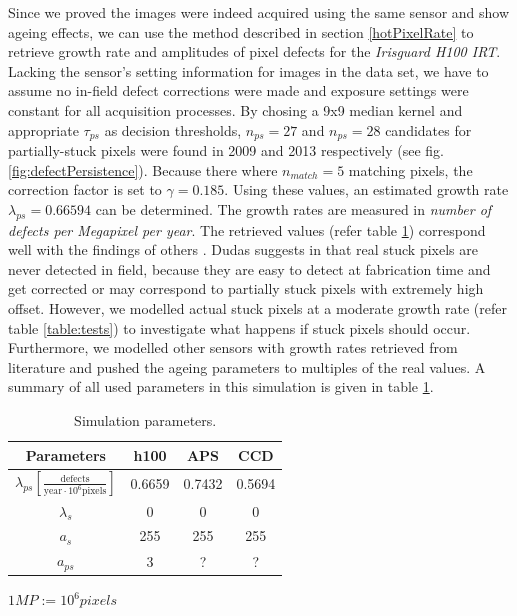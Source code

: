 \documentclass[10pt,twocolumn,letterpaper]{article}
\begin{document}
Since we proved the images were indeed acquired using the same sensor and show ageing effects, we can use the method described in section \ref{hotPixelRate} to retrieve growth rate and amplitudes of pixel defects for the \emph{Irisguard H100 IRT}. Lacking the sensor's setting information for images in the data set, we have to assume no in-field defect corrections \cite{inFieldDefects} were made and exposure settings were constant for all acquisition processes. By chosing a 9x9 median kernel and appropriate $\tau_{ps}$ as decision thresholds, $n_{ps}=27$ and $n_{ps}=28$ candidates for partially-stuck pixels were found in 2009 and 2013 respectively (see fig. \ref{fig:defectPersistence}). Because there where $n_{match}=5$ matching pixels, the correction factor is set to $\gamma=0.185$. Using these values, an estimated growth rate $\lambda_{ps}=0.66594$ can be determined. The growth rates are measured in \emph{number of defects per Megapixel per year}. The retrieved values (refer table \ref{table:parameters}) correspond well with the findings of others \cite{defectDetection, leung}. Dudas suggests in \cite{inFieldDefects} that real stuck pixels are never detected in field, because they are easy to detect at fabrication time and get corrected or may correspond to partially stuck pixels with extremely high offset. However, we modelled actual stuck pixels at a moderate growth rate (refer table \ref{table:tests}) to investigate what happens if stuck pixels should occur. Furthermore, we modelled other sensors with growth rates retrieved from literature and pushed the ageing parameters to multiples of the real values. A summary of all used parameters in this simulation is given in table \ref{table:parameters}.


 \bgroup
\def\arraystretch{1.3}%
 \begin{table} [hbt]
  \begin{center}
    \begin{tabular}{|c | c c c|}
    \hline 
    \textbf{Parameters} & h100  & APS \cite{leung} & CCD \cite{leung} \\
    \hline 
    $\lambda_{ps} [\frac{\text{defects}}{\text{year} \cdot 10^6 \text{pixels}}]$  & 0.6659 &  0.7432 & 0.5694 \\
    $\lambda_s$ 	&  0  & 0 & 0 \\
    $a_s$		&  255  & 255 & 255 \\
    $a_{ps}$	&  3  & ? & ? \\
    \hline  
    \end{tabular}

    \vspace{1mm}
    \hfill \tiny { $1MP := 10^6 pixels$}
     \vspace{-2mm}
    
    \caption{Simulation parameters. }
    \label{table:parameters}
  \end{center}
  \vspace{-5mm}
\end{table}
\end{document}
